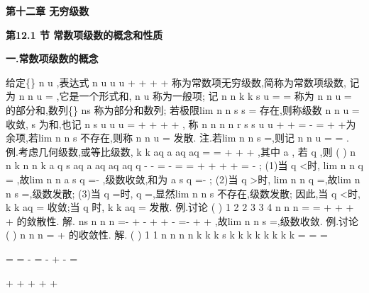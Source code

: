 \begin{center}
{\Large \bfseries \textcolor{lyred}{第十二章 无穷级数}}
\end{center}

\vspace{6pt}
{\large \bfseries \textcolor{lyred}{第12.1 节 常数项级数的概念和性质}}

\vspace{4pt}
{\bfseries \textcolor{lyred}{一.常数项级数的概念}}

给定\{\}
n
u
,表达式
n
u
u
u
+
+
+
+
\Lambda 
\Lambda 称为\textcolor{lyred}{常数项无穷级数},简称为\textcolor{lyred}{常数项级数}, 
记为
n
n
u
\infty 
=\sum 
,它是一个形式和,
n
u 称为\textcolor{lyred}{一般项}; 
记
n
n
k
k
s
u
=
=\sum 
称为
n
n
u
\infty 
=\sum 
的\textcolor{lyred}{部分和},数列\{\}
ns
称为\textcolor{lyred}{部分和数列}; 
若极限lim
n
n
s
s
\to \infty 
=
存在,则称级数
n
n
u
\infty 
=\sum 
\textcolor{lyred}{收敛}, s 为\textcolor{lyred}{和},也记
n
s
u
u
u
=
+
+
+
+
\Lambda 
\Lambda , 
称
n
n
n
n
r
s
s
u
u
+
+
=
-
=
+
+\Lambda 为\textcolor{lyred}{余项},若lim
n
n
s
\to \infty 
不存在,则称
n
n
u
\infty 
=\sum 
\textcolor{lyred}{发散}. 
\textcolor{lyred}{注}.若lim
n
n
s
\to \infty 
=\infty ,则记
n
n
u
\infty 
=
=\infty 
\sum 
. 
\textcolor{lyred}{例}.考虑\textcolor{lyred}{几何级数},或\textcolor{lyred}{等比级数},
k
k
aq
a
aq
aq
\infty 
=
=
+
+
+
\sum 
\Lambda ,其中
a \neq 
,\textcolor{lyred}{ }
若
q \neq ,则
(
)
n
n
k
n
n
k
a
q
s
aq
a
aq
aq
aq
q
-
-
=
-
=
=
+
+
+
+
=
-
\sum 
\Lambda 
; 
(1)当
q <时, lim
n
n
q
\to \infty 
=
,故lim
n
n
a
s
q
\to \infty 
=-
,级数收敛,和为
a
s
q
=-
; 
(2)当
q >时, lim
n
n
q
\to \infty 
=\infty ,故lim
n
n
s
\to \infty 
=\infty ,级数发散; 
(3)当
q =时,
q =\pm ,显然lim
n
n
s
\to \infty 
不存在,级数发散; 
因此,当
q <时,
k
k
aq
\infty 
=\sum 
收敛;当
q \ge 时,
k
k
aq
\infty 
=\sum 
发散. 
\textcolor{lyred}{例}.讨论
(
)
1 2
2 3
3 4
n
n n
\infty 
=
=
+
+
+
+
\cdots 
\cdots 
\cdots 
\sum 
\Lambda 的敛散性. 
解.
ns
n
n
n
=-
+
-
+
+
-
=-
+
+
\Lambda 
,故lim
n
n
s
\to \infty 
=,级数收敛. 
\textcolor{lyred}{例}.讨论
(
)
n
n n
\infty 
=
+
\sum 
的收敛性. 
解.
(
)
1 1
n
n
n
n
k
k
k
s
k k
k
k
k
k
k
k
=
=
=








=
=
-
=
-
+
-
=








+
+
+
+
+








